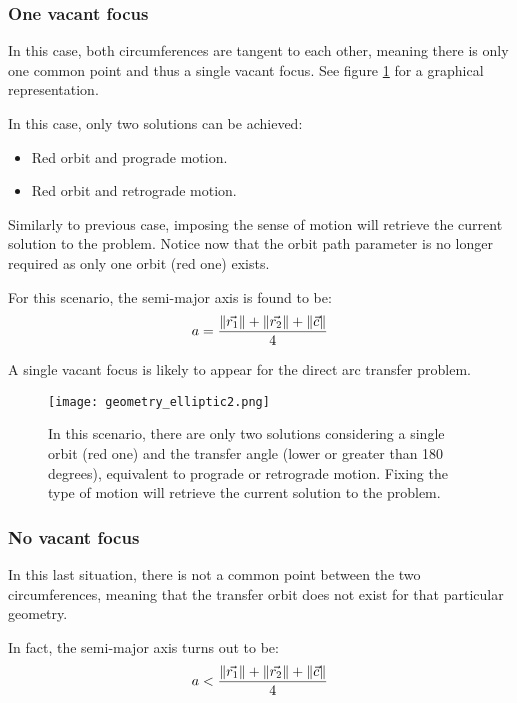 \subsubsection{One vacant focus}
In this case, both circumferences are tangent to each other, meaning there is
only one common point and thus a single vacant focus. See figure
\ref{fig:elliptic_geometry_2} for a graphical representation.

In this case, only two solutions can be achieved:

\begin{itemize}
  \item Red orbit and prograde motion.
  \item Red orbit and retrograde motion.
\end{itemize}

Similarly to previous case, imposing the sense of motion will retrieve the
current solution to the problem. Notice now that the orbit path parameter is no
longer required as only one orbit (red one) exists.


For this scenario, the semi-major axis is found to be:
\begin{equation}
  a = \frac{\lVert\vec{r_{1}}\rVert + \lVert\vec{r_{2}}\rVert + \lVert\vec{c}\rVert}{4}
\end{equation}

A single vacant focus is likely to appear for the direct arc transfer problem.

\begin{figure}[H]
  \centering
  \texttt{[image: geometry\_elliptic2.png]}
  \caption[Elliptic transfer geometry for one vacant focus]{
    In this scenario, there are only two solutions considering a single orbit
    (red one) and the transfer angle (lower or greater than 180 degrees),
    equivalent to prograde or retrograde motion. Fixing the type of motion will retrieve the current solution to the problem.
  }
  \label{fig:elliptic_geometry_2}
\end{figure}


\subsubsection{No vacant focus}
In this last situation, there is not a common point between the two
circumferences, meaning that the transfer orbit does not exist for that
particular geometry.

In fact, the semi-major axis turns out to be:
\begin{equation}
  a < \frac{\lVert\vec{r_{1}}\rVert + \lVert\vec{r_{2}}\rVert + \lVert\vec{c}\rVert}{4}
\end{equation}

